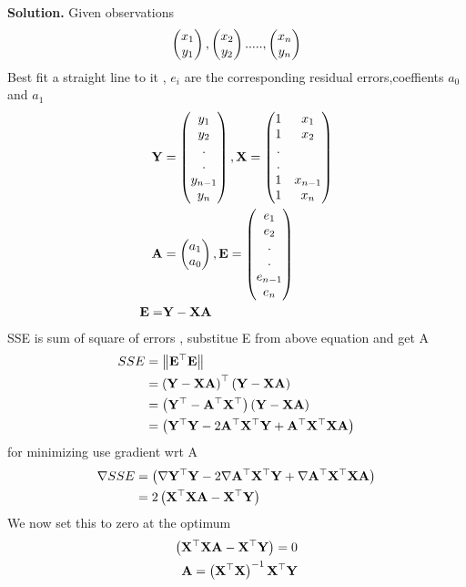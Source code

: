 \documentclass[journal,12pt,twocolumn]{IEEEtran}
\begin{document}
	\textbf{Solution.}
	Given observations
	\begin{align}
		 \begin{pmatrix}x_1\\y_1\end{pmatrix},\begin{pmatrix}x_2\\y_2\end{pmatrix}.....,\begin{pmatrix}x_n\\y_n\end{pmatrix}
	\end{align}
	Best fit a straight line to it , $e_i$ are the corresponding residual errors,coeffients $a_0$and $a_1$
	      \begin{align}   
	      	\mathbf{Y}&=\begin{pmatrix}y_1\\y_2\\.\\.\\y_{n-1}\\y_n\end{pmatrix},
	      	\mathbf{X}=\begin{pmatrix}1&x_1\\1&x_2\\.&\\.&\\1&x_{n-1}\\1&x_n\end{pmatrix}
	      	\\
	      	\mathbf{A}&=\begin{pmatrix}a_1\\a_0\end{pmatrix},
	      	\mathbf{E}=\begin{pmatrix}e_1\\e_2\\.\\.\\e_{n-1}\\e_n\end{pmatrix}\\
      		\mathbf{E}=&\mathbf{Y}-\mathbf{X}\mathbf{A}
      	\end{align}
SSE is sum of square of errors , substitue E from above equation and get A
      \begin{align}
      	SSE&=\left\lVert\mathbf{E}^{\top}\mathbf{E}\right\rVert\\ &=\left(\mathbf{Y}-\mathbf{X}\mathbf{A}\right)^{\top}\left(\mathbf{Y}-\mathbf{X}\mathbf{A}\right)\\
      	&=\left(\mathbf{Y}^{\top}-\mathbf{A}^{\top}\mathbf{X}^{\top}\right)\left(\mathbf{Y}-\mathbf{X}\mathbf{A}\right)
      	\\
      	&=\left(\mathbf{Y}^{\top}\mathbf{Y}-2\mathbf{A}^{\top}\mathbf{X}^{\top}\mathbf{Y}+\mathbf{A}^{\top}\mathbf{X}^{\top}\mathbf{X}\mathbf{A}\right)
      	      \end{align}
            for minimizing use gradient wrt A
      	\begin{align}
      	 \nabla
      		SSE
      		&=\left(\nabla\mathbf{Y}^{\top}\mathbf{Y}-2\nabla\mathbf{A}^{\top}\mathbf{X}^{\top}\mathbf{Y}+\nabla\mathbf{A}^{\top}\mathbf{X}^{\top}\mathbf{X}\mathbf{A}\right)\\
      		&=2\left(\mathbf{X}^{\top}\mathbf{X}\mathbf{A}-\mathbf{X}^{\top}\mathbf{Y}\right)
      	\end{align}
      We now set this to zero at the optimum
      \begin{align}
       \left(\mathbf{X}^{\top}\mathbf{X}\mathbf{A}-\mathbf{X}^{\top}\mathbf{Y}\right)=0\\
       \mathbf{A}=\left(\mathbf{X}^{\top}\mathbf{X}\right)^{-1}\mathbf{X}^{\top}\mathbf{Y}
      \end{align}
\end{document}
